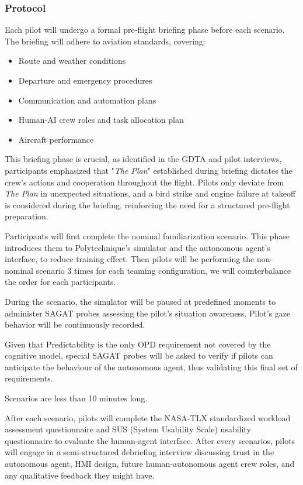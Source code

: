 \documentclass[12pt,a4paper]{article} %
\begin{document}
	\subsubsection{Protocol}
	Each pilot will undergo a formal pre-flight briefing phase before each scenario. The briefing will adhere to aviation standards, covering:
	\begin{itemize}
		\item Route and weather conditions
		\item Departure and emergency procedures
		\item Communication and automation plans
		\item Human-AI crew roles and task allocation plan
		\item Aircraft performance 
	\end{itemize}
	This briefing phase is crucial, as identified in the GDTA and pilot interviews, participants emphasized that "\textit{The Plan}" established during briefing dictates the crew's actions and cooperation throughout the flight. Pilots only deviate from \textit{The Plan} in unexpected situations, and a bird strike and engine failure at takeoff is considered during the briefing, reinforcing the need for a structured pre-flight preparation.

	Participants will first complete the nominal familiarization scenario. This phase introduces them to Polytechnique's simulator and the autonomous agent's interface, to reduce training effect. Then pilots will be performing the non-nominal scenario 3 times for each teaming configuration, we will counterbalance the order for each participants. 

	During the scenario, the simulator will be paused at predefined moments to administer SAGAT probes assessing the pilot's situation awareness. Pilot's gaze behavior will be continuously recorded.

	Given that Predictability is the only OPD requirement not covered by the cognitive model, special SAGAT probes will be asked to verify if pilots can anticipate the behaviour of the autonomous agent, thus validating this final set of requirements.
	
	Scenarios are less than 10 minutes long.

	After each scenario, pilots will complete the NASA-TLX standardized workload assessment questionnaire and SUS (System Usability Scale) usability questionnaire to evaluate the human-agent interface. After every scenarios, pilots will engage in a semi-structured debriefing interview discussing trust in the autonomous agent, HMI design, future human-autonomous agent crew roles, and any qualitative feedback they might have.
\end{document}
